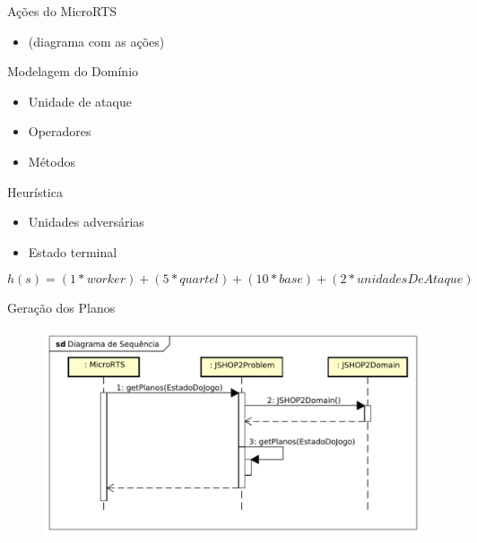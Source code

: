 \documentclass{beamer}
\begin{document}
\begin{frame}{Ações do MicroRTS}
	\begin{itemize}
		\item (diagrama com as ações)
	\end{itemize}
\end{frame}
\begin{frame}{Modelagem do Domínio}
	\begin{itemize}
		\item Unidade de ataque
		\item Operadores
		\item Métodos
	\end{itemize}
\end{frame}
\begin{frame}{Heurística}
	\begin{itemize}
		\item Unidades adversárias
		\item Estado terminal
	\end{itemize}
	\vspace{5mm}
	\begin{equation}
	h(s) =  (1*worker) + (5 * quartel) + (10 * base) + (2 * unidadesDeAtaque)
	\end{equation}
\end{frame}
\begin{frame}{Geração dos Planos}
	\begin{figure}[here]
		\includegraphics[width=0.9\linewidth]{fig/gerarPlano.pdf}	
	\end{figure}	
\end{frame}
\end{document}
